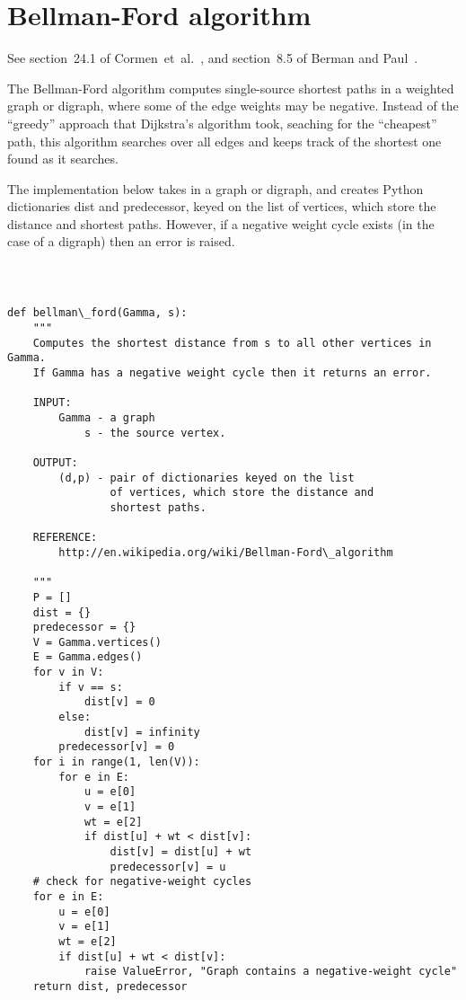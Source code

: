 
\section{Bellman-Ford algorithm}

See section~24.1 of Cormen~et~al.~\cite{CormenEtAl2001}, and
section~8.5 of Berman and Paul~\cite{BermanPaul1997}.

The Bellman-Ford algorithm computes single-source shortest paths in a weighted 
graph or digraph, where some of the edge weights may be negative.
Instead of the ``greedy'' approach that Dijkstra's algorithm took, 
seaching for the ``cheapest'' path, this algorithm searches over all
edges and keeps track of the shortest one found as it searches.

The implementation below takes in a graph or digraph, and creates Python
dictionaries dist and predecessor, keyed on the list of vertices, 
which store the distance and shortest paths. However, if a 
negative weight cycle exists (in the case of a digraph) then 
an error is raised.

%
\begin{center}
\fontsize{9pt}{9pt}
\selectfont
\tt
\begin{lstlisting}

def bellman\_ford(Gamma, s):
    """
    Computes the shortest distance from s to all other vertices in Gamma.
    If Gamma has a negative weight cycle then it returns an error.

    INPUT:
        Gamma - a graph 
            s - the source vertex.

    OUTPUT:
        (d,p) - pair of dictionaries keyed on the list 
                of vertices, which store the distance and 
                shortest paths.

    REFERENCE:
        http://en.wikipedia.org/wiki/Bellman-Ford\_algorithm

    """
    P = []
    dist = {}
    predecessor = {}
    V = Gamma.vertices()
    E = Gamma.edges()
    for v in V:
        if v == s:
            dist[v] = 0
        else:
            dist[v] = infinity
        predecessor[v] = 0
    for i in range(1, len(V)):       
        for e in E: 
            u = e[0]
            v = e[1]     
            wt = e[2]     
            if dist[u] + wt < dist[v]:
                dist[v] = dist[u] + wt
                predecessor[v] = u
    # check for negative-weight cycles
    for e in E:
        u = e[0]
        v = e[1]     
        wt = e[2]     
        if dist[u] + wt < dist[v]:
            raise ValueError, "Graph contains a negative-weight cycle"
    return dist, predecessor

\end{lstlisting}
\end{center}

